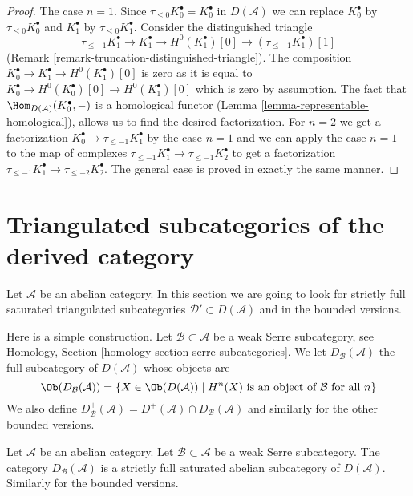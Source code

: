\begin{proof}
The case $n = 1$. Since $\tau_{\leq 0}K_0^\bullet = K_0^\bullet$
in $D(\mathcal{A})$ we can replace
$K_0^\bullet$ by $\tau_{\leq 0}K_0^\bullet$ and
$K_1^\bullet$ by $\tau_{\leq 0}K_1^\bullet$.
Consider the distinguished triangle
$$
\tau_{\leq -1}K_1^\bullet \to K_1^\bullet \to
H^0(K_1^\bullet)[0] \to (\tau_{\leq -1}K_1^\bullet)[1]
$$
(Remark \ref{remark-truncation-distinguished-triangle}).
The composition $K_0^\bullet \to K_1^\bullet \to H^0(K_1^\bullet)[0]$
is zero as it is equal to $K_0^\bullet \to H^0(K_0^\bullet)[0] \to
H^0(K_1^\bullet)[0]$ which is zero by assumption.
The fact that $\Hom_{D(\mathcal{A})}(K_0^\bullet, -)$
is a homological functor (Lemma \ref{lemma-representable-homological}),
allows us to find the desired factorization.
For $n = 2$ we get a factorization
$K_0^\bullet \to \tau_{\leq -1}K_1^\bullet$ by the case $n = 1$
and we can apply the case $n = 1$ to the map of complexes
$\tau_{\leq -1}K_1^\bullet \to \tau_{\leq -1}K_2^\bullet$
to get a factorization
$\tau_{\leq -1}K_1^\bullet \to \tau_{\leq -2}K_2^\bullet$.
The general case is proved in exactly the same manner.
\end{proof}




\section{Triangulated subcategories of the derived category}
\label{section-triangulated-sub}

\noindent
Let $\mathcal{A}$ be an abelian category. In this section we are
going to look for strictly full saturated triangulated subcategories
$\mathcal{D}' \subset D(\mathcal{A})$ and in the bounded versions.

\medskip\noindent
Here is a simple construction. Let $\mathcal{B} \subset \mathcal{A}$
be a weak Serre subcategory, see
Homology, Section \ref{homology-section-serre-subcategories}.
We let $D_\mathcal{B}(\mathcal{A})$ the full subcategory of
$D(\mathcal{A})$ whose objects are
$$
\Ob(D_\mathcal{B}(\mathcal{A}))
=
\{X \in \Ob(D(\mathcal{A})) \mid
H^n(X) \text{ is an object of }\mathcal{B}\text{ for all }n\}
$$
We also define
$D^{+}_\mathcal{B}(\mathcal{A}) =
D^{+}(\mathcal{A}) \cap D_\mathcal{B}(\mathcal{A})$
and similarly for the other bounded versions.

\begin{lemma}
\label{lemma-cohomology-in-serre-subcategory}
Let $\mathcal{A}$ be an abelian category.
Let $\mathcal{B} \subset \mathcal{A}$ be a weak Serre subcategory.
The category $D_\mathcal{B}(\mathcal{A})$ is a strictly full
saturated abelian subcategory of $D(\mathcal{A})$.
Similarly for the bounded versions.
\end{lemma}

